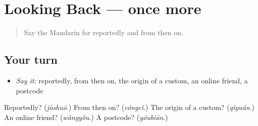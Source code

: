 \section[(dialogue)]{Looking Back — once more}

\label{lesson:ZH-R345-review-final-345}



\begin{quote}
Say the Mandarin for reportedly and from then on.
\end{quote}

\subsection*{Your turn}
\begin{itemize}
\raggedright
  \item \emph{Say it:} reportedly, from then on, the origin of a custom, an online friend, a postcode
\end{itemize}

\begin{tcolorbox}[breakable,colback=teal!4,colframe=teal!35!black,title={Before you move on}]
Reportedly? (\emph{jùshuō}.) From then on? (\emph{cóngcǐ}.) The origin of a custom? (\emph{qǐyuán}.) An online friend? (\emph{wǎngyǒu}.) A postcode? (\emph{yóubiān}.)
\end{tcolorbox}
